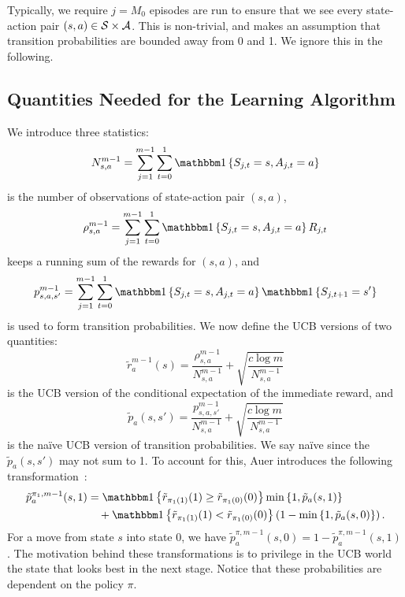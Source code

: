 \documentclass[11pt]{article}
\begin{document}
Typically, we require $j=M_{0}$ episodes are run to ensure that we see every state-action pair $(s,a) \in \mathcal{S}\times\mathcal{A}$. This is non-trivial, and makes an assumption that transition probabilities are bounded away from 0 and 1. We ignore this in the following.

\subsection{Quantities Needed for the Learning Algorithm}

We introduce three statistics:
\begin{equation}
	\label{eq:N_sa}
	N_{s,a}^{m-1} = \sum_{j=1}^{m-1} \sum_{t=0}^{1} \ind\left\{S_{j,t} = s, A_{j,t} = a\right\}
\end{equation}
is the number of observations of state-action pair $(s,a)$,
\begin{equation}
	\label{eq:rho_sa}
	\rho_{s,a}^{m-1} = \sum_{j=1}^{m-1}\sum_{t=0}^{1} \ind\left\{S_{j,t} = s, A_{j,t} = a\right\} R_{j,t}
\end{equation}
keeps a running sum of the rewards for $(s,a)$, and
\begin{equation}
	\label{eq:p_sas}
	p_{s,a,s'}^{m-1} = \sum_{j=1}^{m-1} \sum_{t=0}^{1} \ind\left\{S_{j,t} = s, A_{j,t} = a\right\} \ind\left\{S_{j,t+1} = s'\right\}
\end{equation}
is used to form transition probabilities. We now define the UCB versions of two quantities:
\begin{equation}
	\tilde{r}_{a}^{m-1}(s) = \frac{\rho_{s,a}^{m-1}}{N_{s,a}^{m-1}} + \sqrt{\frac{c\log m}{N_{s,a}^{m-1}}}
\end{equation}
is the UCB version of the conditional expectation of the immediate reward, and
\begin{equation}
	\tilde{p}_{a}(s,s') = \frac{p_{s,a,s'}^{m-1}}{N_{s,a}^{m-1}} + \sqrt{\frac{c\log m}{N_{s,a}^{m-1}}}
\end{equation}
is the na\"{i}ve UCB version of transition probabilities. We say na\"{i}ve since the $\tilde{p}_{a}(s,s')$ may not sum to 1. To account for this, Auer introduces the following transformation~\cite{auer2005online}:
\begin{equation}
	\label{eq:ucb-modified-transition-prob1}
	\begin{split}
		\tilde{p}_{a}^{\pi_{1}, m-1}(s, 1) &={} \ind\left\{\tilde{r}_{\pi_{1}(1)}(1) \geq \tilde{r}_{\pi_{1}(0)}(0)\right\} \min\left\{1, \tilde{p}_{a}(s,1)\right\} \\
		&\quad + \ind\left\{\tilde{r}_{\pi_{1}(1)}(1) < \tilde{r}_{\pi_{1}(0)}(0)\right\} \left(1 - \min\left\{1, \tilde{p}_{a}(s,0)\right\}\right).
	\end{split}
\end{equation}
For a move from state $s$ into state $0$, we have $\tilde{p}_{a}^{\pi, m-1}(s,0) = 1- \tilde{p}_{a}^{\pi, m-1}(s,1)$.
The motivation behind these transformations is to privilege in the UCB world the state that looks best in the next stage. Notice that these probabilities are dependent on the policy $\pi$.
\end{document}
